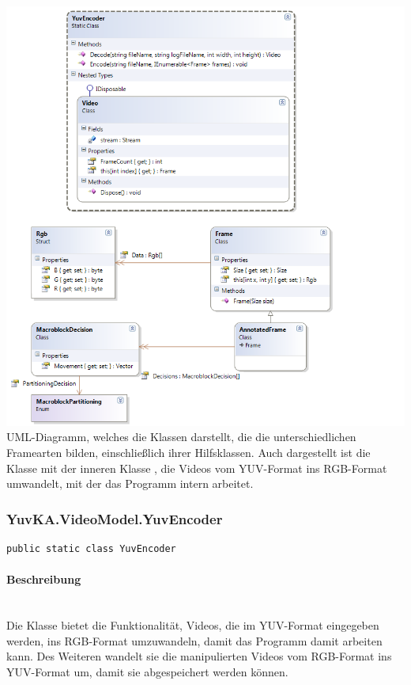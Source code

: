 	
\includegraphics[width=\textwidth]{YuvKA.VideoModel/videomodel.png}
UML-Diagramm, welches die Klassen darstellt, die die unterschiedlichen Framearten bilden, einschließlich ihrer Hilfsklassen. Auch dargestellt ist die Klasse  mit der inneren Klasse , die Videos vom YUV-Format ins RGB-Format umwandelt, mit der das Programm intern arbeitet.

\subsubsection{YuvKA.VideoModel.YuvEncoder}

\begin{verbatim}
public static class YuvEncoder
\end{verbatim}

\paragraph{Beschreibung}~\\
Die Klasse  bietet die Funktionalität, Videos, die im YUV-Format eingegeben werden, ins RGB-Format umzuwandeln, damit das Programm damit arbeiten kann. Des Weiteren wandelt sie die manipulierten Videos vom RGB-Format ins YUV-Format um, damit sie abgespeichert werden können.

